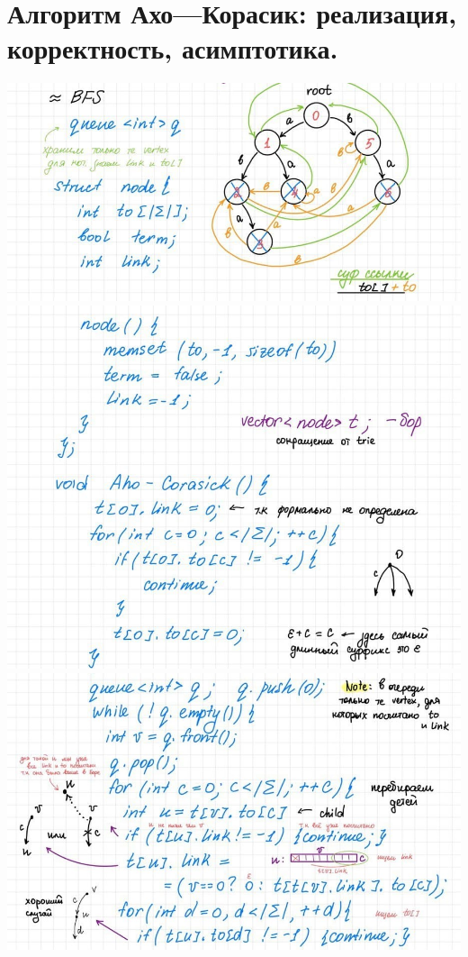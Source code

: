 \section{Алгоритм Ахо—Корасик: реализация, корректность, асимптотика.}

\includegraphics[width=1\linewidth]{images/Building_Aho-Corasic1.jpg}
\newline \includegraphics[width=1\linewidth]{images/Building_Aho-Corasic2.1.jpg}
\newline \includegraphics[width=1\linewidth]{images/Building_Aho-Corasic2.jpg}
